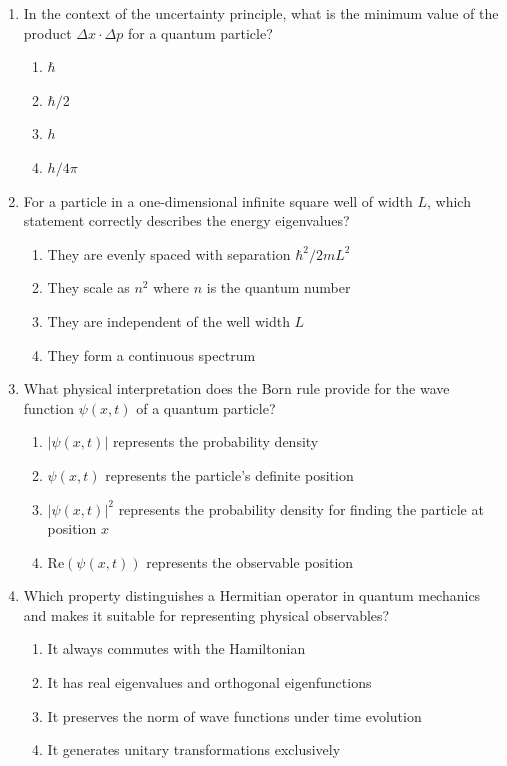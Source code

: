 \documentclass[11pt]{article}
\begin{document}
\begin{enumerate}[label=\textbf{\arabic*.}]

  \item In the context of the uncertainty principle, what is the minimum value of the product 
  $\Delta x \cdot \Delta p$ for a quantum particle?
  \begin{enumerate}[label=(\Alph*)]
    \item $\hbar$
    \item $\hbar/2$
    \item $h$
    \item $h/4\pi$
  \end{enumerate}

  \item For a particle in a one-dimensional infinite square well of width $L$, which statement 
  correctly describes the energy eigenvalues?
  \begin{enumerate}[label=(\Alph*)]
    \item They are evenly spaced with separation $\hbar^2/2mL^2$
    \item They scale as $n^2$ where $n$ is the quantum number
    \item They are independent of the well width $L$
    \item They form a continuous spectrum
  \end{enumerate}

  \item What physical interpretation does the Born rule provide for the wave function $\psi(x,t)$ 
  of a quantum particle?
  \begin{enumerate}[label=(\Alph*)]
    \item $|\psi(x,t)|$ represents the probability density
    \item $\psi(x,t)$ represents the particle's definite position
    \item $|\psi(x,t)|^2$ represents the probability density for finding the particle at position $x$
    \item $\text{Re}(\psi(x,t))$ represents the observable position
  \end{enumerate}

  \item Which property distinguishes a Hermitian operator in quantum mechanics and makes it suitable 
  for representing physical observables?
  \begin{enumerate}[label=(\Alph*)]
    \item It always commutes with the Hamiltonian
    \item It has real eigenvalues and orthogonal eigenfunctions
    \item It preserves the norm of wave functions under time evolution
    \item It generates unitary transformations exclusively
  \end{enumerate}


\end{enumerate}
\end{document}
